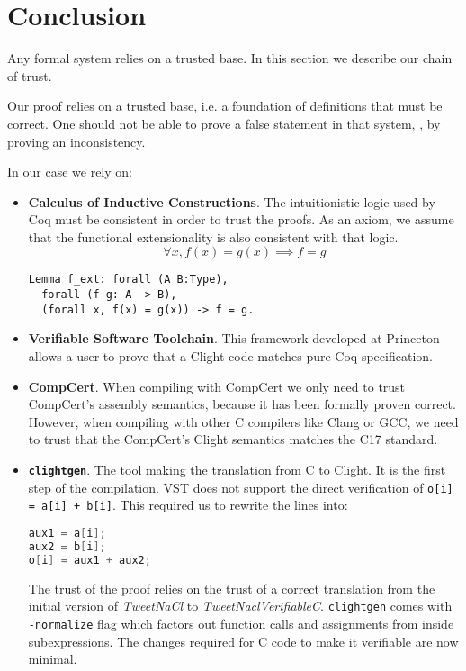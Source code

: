 \section{Conclusion}
\label{sec:Conclusion}

Any formal system relies on a trusted base. In this section we describe our
chain of trust.

Our proof relies on a trusted base, i.e. a foundation of definitions that must be
correct. One should not be able to prove a false statement in that system, \eg, by
proving an inconsistency.

In our case we rely on:
\begin{itemize}
  \item \textbf{Calculus of Inductive Constructions}. The intuitionistic logic
  used by Coq must be consistent in order to trust the proofs. As an axiom,
  we assume that the functional extensionality is also consistent with that logic.
  $$\forall x, f(x) = g(x) \implies f = g$$
\begin{lstlisting}[language=Coq]
Lemma f_ext: forall (A B:Type),
  forall (f g: A -> B),
  (forall x, f(x) = g(x)) -> f = g.
\end{lstlisting}

  \item \textbf{Verifiable Software Toolchain}. This framework developed at
  Princeton allows a user to prove that a Clight code matches pure Coq
  specification.

  \item \textbf{CompCert}.
  When compiling with CompCert we only need to trust CompCert's {assembly} semantics, because it has been formally proven correct.
  However, when compiling with other C compilers like Clang or GCC, we need to trust that the CompCert's Clight semantics matches the C17 standard.

  \item \textbf{\texttt{clightgen}}. The tool making the translation from {C} to
  {Clight}. It is the first step of the compilation.
  VST does not support the direct verification of \texttt{o[i] = a[i] + b[i]}.
  This required us to rewrite the lines into:
\begin{lstlisting}[language=C]
aux1 = a[i];
aux2 = b[i];
o[i] = aux1 + aux2;
\end{lstlisting}
  The trust of the proof relies on the trust of a correct translation from the
  initial version of \emph{TweetNaCl} to \emph{TweetNaclVerifiableC}.
  \texttt{clightgen} comes with \texttt{-normalize} flag which
  factors out function calls and assignments from inside subexpressions.
  The changes required for C code to make it verifiable are now minimal.


\end{itemize}
